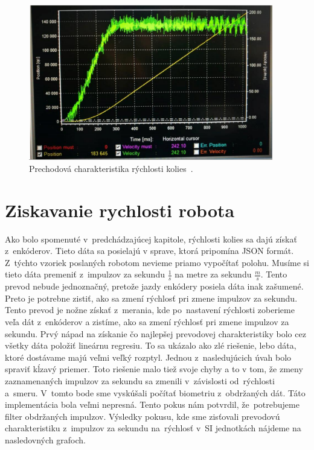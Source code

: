 \begin{figure}[!htbp]
	\begin{center}
		\includegraphics[width=0.95\textwidth]{img/robotSpeedChar.png}
	\end{center}
	\caption{Prechodová charakteristika rýchlosti kolies~\cite{timovyProjekt}. }
	\label{fig:prechChar}
\end{figure}

\section{Ziskavanie rychlosti robota}
\label{sec:ziskavanieRychlosti}

Ako bolo spomenuté v~predchádzajúcej kapitole, rýchlosti kolies sa dajú získať z~enkóderov. Tieto dáta sa posielajú v sprave, ktorá pripomína JSON formát.
Z~týchto vzoriek poslaných robotom nevieme priamo vypočítať polohu. Musíme si tieto dáta premeniť z~impulzov za sekundu \(\frac{1}{s}\) na metre
za sekundu \(\frac{m}{s}\). Tento prevod nebude jednoznačný, pretože jazdy enkódery posiela dáta inak zašumené. Preto je potrebne zistiť, ako sa zmení
rýchlosť pri zmene impulzov za sekundu. Tento prevod je nožne získať z~merania, kde po~nastavení rýchlosti zoberieme veľa dát z~enkóderov a zistíme,
ako sa zmení rýchlosť pri zmene impulzov za sekundu. Prvý nápad na získanie čo najlepšej prevodovej charakteristiky bolo cez všetky dáta položiť
lineárnu regresiu. To sa ukázalo ako zlé riešenie, lebo dáta, ktoré dostávame majú veľmi veľký rozptyl. Jednou z~nasledujúcich úvah bolo spraviť
kĺzavý priemer. Toto riešenie malo tiež svoje chyby a to v tom, že zmeny zaznamenaných impulzov za sekundu sa zmenili v~závislosti od~rýchlosti a~smeru.
V~tomto bode sme vyskúšali počítať biometriu z~obdržaných dát. Táto implementácia bola veľmi nepresná. Tento pokus nám potvrdil, že~potrebujeme filter
obdržaných impulzov. Výsledky pokusu, kde sme zisťovali prevodovú charakteristiku z~impulzov za sekundu na~rýchlosť v~SI jednotkách nájdeme
na nasledovných grafoch.

